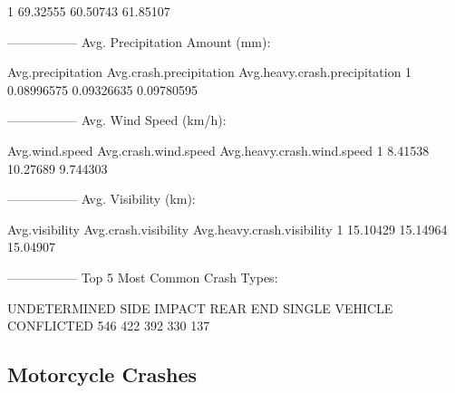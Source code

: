 \documentclass[11pt, a4paper]{article}
\begin{document}
\begin{Schunk}
\begin{Soutput}
1     69.32555           60.50743                 61.85107
\end{Soutput}
\begin{Soutput}
-----------------
Avg. Precipitation Amount (mm):
\end{Soutput}
\begin{Soutput}
  Avg.precipitation Avg.crash.precipitation Avg.heavy.crash.precipitation
1        0.08996575              0.09326635                    0.09780595
\end{Soutput}
\begin{Soutput}
-----------------
Avg. Wind Speed (km/h):
\end{Soutput}
\begin{Soutput}
  Avg.wind.speed Avg.crash.wind.speed Avg.heavy.crash.wind.speed
1        8.41538             10.27689                   9.744303
\end{Soutput}
\begin{Soutput}
-----------------
Avg. Visibility (km):
\end{Soutput}
\begin{Soutput}
  Avg.visibility Avg.crash.visibility Avg.heavy.crash.visibility
1       15.10429             15.14964                   15.04907
\end{Soutput}
\begin{Soutput}
-----------------
Top 5 Most Common Crash Types:
\end{Soutput}
\begin{Soutput}
  UNDETERMINED    SIDE IMPACT       REAR END SINGLE VEHICLE     CONFLICTED 
           546            422            392            330            137 
\end{Soutput}
\end{Schunk}



\pagebreak
\subsection{Motorcycle Crashes}
\end{document}
